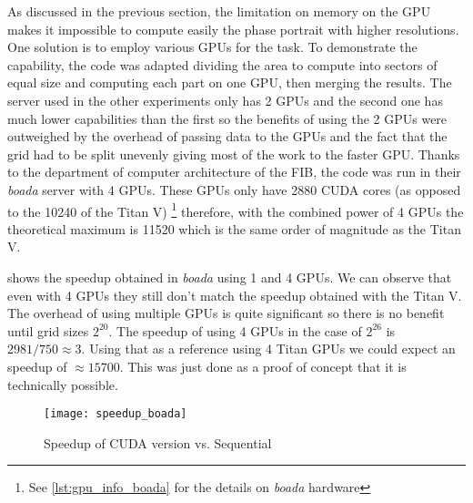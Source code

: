 As discussed in the previous section, the limitation on memory on the GPU makes it impossible to compute easily the phase portrait with higher resolutions. One solution is to employ various GPUs for the task. To demonstrate the capability, the code was adapted dividing the area to compute into sectors of equal size and computing each part on one GPU, then merging the results. The server used in the other experiments only has 2 GPUs and the second one has much lower capabilities than the first so the benefits of using the 2 GPUs were outweighed by the overhead of passing data to the GPUs and the fact that the grid had to be split unevenly giving most of the work to the faster GPU. Thanks to the department of computer architecture of the FIB, the code was run in their \emph{boada} server with 4 GPUs. These GPUs only have 2880 CUDA cores (as opposed to the 10240 of the Titan V) \footnote{See \cref{lst:gpu_info_boada} for the details on \emph{boada} hardware} therefore, with the combined power of 4 GPUs the theoretical maximum is 11520 which is the same order of magnitude
as the Titan V.

 shows the speedup obtained in \emph{boada} using 1 and 4 GPUs. We can observe that even with 4 GPUs they still don't match the speedup obtained with the Titan V. The overhead of using multiple GPUs is quite significant so there is no benefit until grid sizes $2^{20}$. The speedup of using 4 GPUs in the case of
$2^{26}$ is $2981/750 \approx 3$. Using that as a reference using 4 Titan GPUs we could expect an speedup of $\approx 15700$. This was just done as a proof of concept that it is technically possible.

\begin{figure}[H]
    \centering
    \texttt{[image: speedup\_boada]}
    \caption{Speedup of CUDA version vs. Sequential}%
    \label{fig:speedup_boada}
\end{figure}